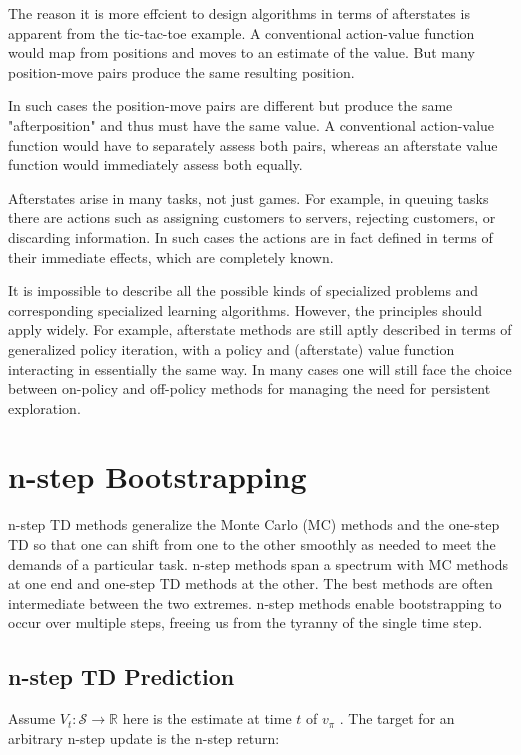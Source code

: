 \documentclass{article}
\begin{document}
The reason it is more effcient to design algorithms in terms of afterstates is apparent from the tic-tac-toe example. A conventional action-value function would map from positions and moves to an estimate of the value. 
But many position-move pairs produce the same resulting position.

In such cases the position-move pairs are different but produce the same "afterposition" and thus must have the same value. A conventional action-value function would have to separately assess both pairs, 
whereas an afterstate value function would immediately assess both equally.

Afterstates arise in many tasks, not just games. For example, in queuing tasks there are actions such as assigning customers to servers, rejecting customers, or discarding information. 
In such cases the actions are in fact defined in terms of their immediate effects, which are completely known.

It is impossible to describe all the possible kinds of specialized problems and corresponding specialized learning algorithms. However, the principles should apply widely. 
For example, afterstate methods are still aptly described in terms of generalized policy iteration, with a policy and (afterstate) value function interacting in essentially the same way. 
In many cases one will still face the choice between on-policy and off-policy methods for managing the need for persistent exploration.

\section{n-step Bootstrapping}

n-step TD methods generalize the Monte Carlo (MC) methods and the one-step TD so that one can shift from one to the other smoothly as needed to meet the demands of a particular task. n-step methods span a spectrum with 
MC methods at one end and one-step TD methods at the other. The best methods are often intermediate between the two extremes. 
n-step methods enable bootstrapping to occur over multiple steps, freeing us from the tyranny of the single time step.

\subsection{n-step TD Prediction}

Assume $V _ { t } : \mathcal { S } \rightarrow \mathbb { R }$ here is the estimate at time $t$ of $v _ { \pi }$ . The target for an arbitrary n-step update is the n-step return:
\end{document}
